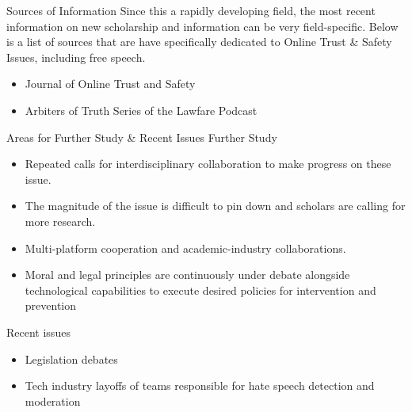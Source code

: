 \documentclass[nobackground,dvipsnames,table]{beamer}
\begin{document}
\begin{frame}{Sources of Information}
Since this a rapidly developing field, the most recent information on new scholarship and information can be very field-specific. Below is a list of sources that are have specifically dedicated to Online Trust \& Safety Issues, including free speech. 

\begin{itemize}
    \item Journal of Online Trust and Safety 
    \item Arbiters of Truth Series of the Lawfare Podcast 
\end{itemize}

\end{frame}

\begin{frame}{Areas for Further Study \& Recent Issues}
Further Study 
\begin{itemize}
    \item Repeated calls for interdisciplinary collaboration to make progress on these issue. 
    \item The magnitude of the issue is difficult to pin down and scholars are calling for more research. 
    \item Multi-platform cooperation and academic-industry collaborations. 
    \item Moral and legal principles are continuously under debate alongside technological capabilities to execute desired policies for intervention and prevention 
\end{itemize}

Recent issues 
\begin{itemize}
    \item Legislation debates 
    \item Tech industry layoffs of teams responsible for hate speech detection and moderation 
\end{itemize}

\end{frame}

\end{document}
